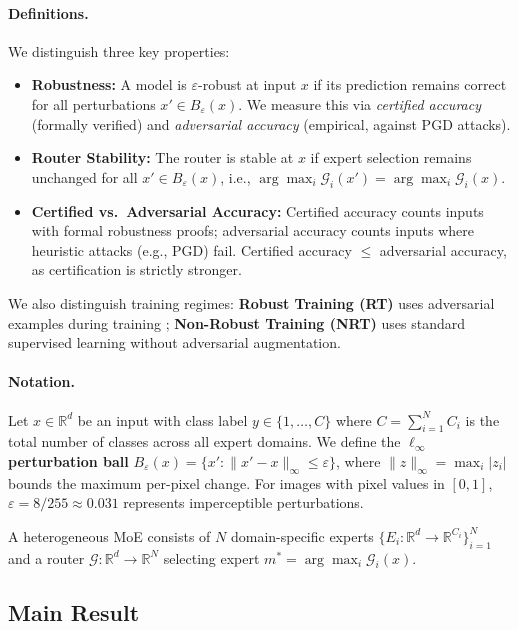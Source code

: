 \documentclass{article}
\theoremstyle{plain}
\theoremstyle{remark}
\begin{document}
\paragraph{Definitions.} We distinguish three key properties:
\begin{itemize}
    \item \textbf{Robustness:} A model is $\varepsilon$-robust at input $x$ if its prediction remains correct for all perturbations $x' \in B_\varepsilon(x)$. We measure this via \textit{certified accuracy} (formally verified) and \textit{adversarial accuracy} (empirical, against PGD attacks).
    \item \textbf{Router Stability:} The router is stable at $x$ if expert selection remains unchanged for all $x' \in B_\varepsilon(x)$, i.e., $\arg\max_i \mathcal{G}_i(x') = \arg\max_i \mathcal{G}_i(x)$.
    \item \textbf{Certified vs.\ Adversarial Accuracy:} Certified accuracy counts inputs with formal robustness proofs; adversarial accuracy counts inputs where heuristic attacks (e.g., PGD) fail. Certified accuracy $\leq$ adversarial accuracy, as certification is strictly stronger.
\end{itemize}
We also distinguish training regimes: \textbf{Robust Training (RT)} uses adversarial examples during training \citep{madry2018}; \textbf{Non-Robust Training (NRT)} uses standard supervised learning without adversarial augmentation.

\paragraph{Notation.} Let $x \in \mathbb{R}^{d}$ be an input with class label $y \in \{1, \ldots, C\}$ where $C = \sum_{i=1}^N C_i$ is the total number of classes across all expert domains. We define the \textbf{$\ell_\infty$ perturbation ball} $B_\varepsilon(x) = \{x': \|x' - x\|_\infty \leq \varepsilon\}$, where $\|z\|_\infty = \max_i |z_i|$ bounds the maximum per-pixel change. For images with pixel values in $[0,1]$, $\varepsilon = 8/255 \approx 0.031$ represents imperceptible perturbations.

A heterogeneous MoE consists of $N$ domain-specific experts $\{E_i: \mathbb{R}^d \to \mathbb{R}^{C_i}\}_{i=1}^N$ and a router $\mathcal{G}: \mathbb{R}^d \to \mathbb{R}^N$ selecting expert $m^* = \arg\max_i \mathcal{G}_i(x)$.

\subsection{Main Result}
\end{document}
